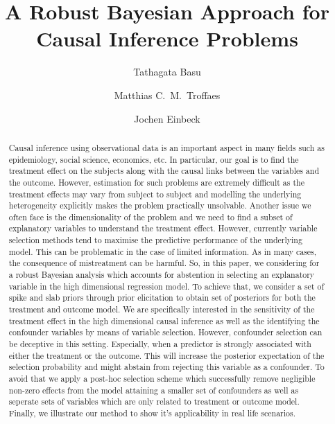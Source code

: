 \documentclass[oribibl]{llncs}
\begin{document}
\title{A Robust Bayesian Approach for Causal Inference Problems
}
%
\author{Tathagata Basu \and
Matthias C.~M.~Troffaes \and
Jochen Einbeck}
%
%
%
\maketitle              
%
\begin{abstract}
Causal inference using observational data is an important aspect in
many fields such as epidemiology, social science, economics, etc. In
particular, our goal is to find the treatment effect on the subjects
along with the causal links between the variables and the outcome.
However, estimation for such problems are extremely
difficult as the treatment effects may vary from subject
to subject and modelling the underlying heterogeneity explicitly makes the
problem practically unsolvable. Another issue we often face is the
dimensionality of the problem and we need to find a subset of
explanatory variables to understand the treatment effect.
However, currently variable selection methods tend to maximise the
predictive performance of the underlying model. This can be problematic
in the case of limited information. As in many cases, the consequence of
mistreatment can be harmful. So, in this paper, we considering for a
robust Bayesian analysis which accounts for abstention in selecting
an explanatory variable in the high dimensional regression model.
To achieve that, we consider a set of spike and slab priors
through prior elicitation to obtain set of posteriors for
both the treatment and outcome model. We are specifically interested
in the sensitivity of the treatment effect in the high dimensional causal
inference as well as the identifying the confounder variables by means
of variable selection. However, confounder selection can be deceptive
in this setting. Especially, when a predictor is strongly associated
with either the treatment or the outcome. This will increase the posterior
expectation of the selection probability and might abstain from rejecting
this variable as a confounder. To avoid that we apply a post-hoc selection scheme
which successfully remove negligible non-zero effects from the model
attaining a smaller set of confounders as well as seperate sets of variables
which are only related to treatment or outcome model. Finally, we illustrate
our method to show it's applicability in real life scenarios.

\end{abstract}
\end{document}

